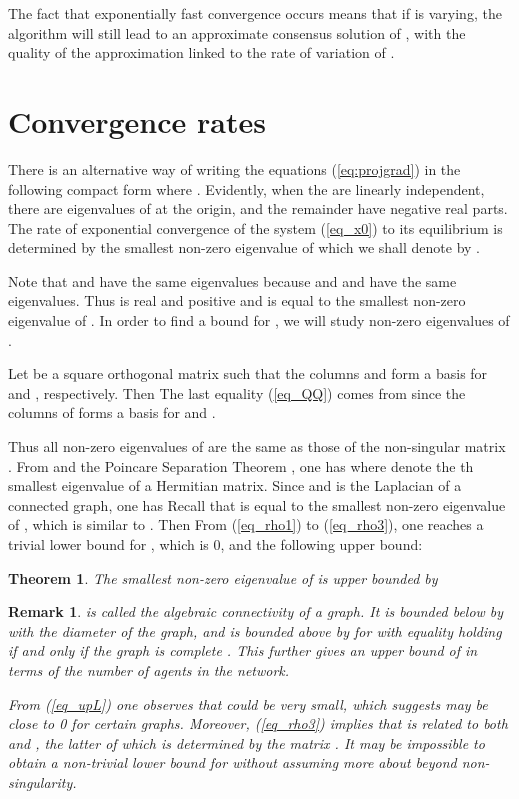\documentclass{aims}
\newtheorem{remark}{Remark}
\newtheorem{thm}{\textbf{Theorem}}
\def\eq#1{}
\begin{document}
The fact that exponentially fast convergence occurs means that if  is varying, the algorithm will still lead to an approximate consensus solution of , with the quality of the approximation linked to the rate of variation of .



\section{Convergence rates}
There is an alternative way of writing the equations (\ref{eq:projgrad}) in the following compact form
 where .
Evidently, when the  are linearly independent, there are  eigenvalues of  at the origin, and the remainder have negative real parts. The rate of exponential convergence of the system (\ref{eq_x0}) to its equilibrium is determined by the smallest non-zero eigenvalue of  which we shall denote by .

Note that  and  have the same eigenvalues because  and  and  have the same eigenvalues. Thus  is real and positive and is equal to the smallest non-zero eigenvalue of . In order to find a bound for , we will study non-zero eigenvalues of .



Let  be a square orthogonal matrix such that the columns  and  form a basis for  and , respectively.
Then  The last equality (\ref{eq_QQ}) comes from  since the columns of  forms a basis for  and .

Thus all non-zero eigenvalues of  are the same as those of the non-singular matrix . From  and the Poincare Separation Theorem \cite{RC85Book}, one has \eq{\label{eq_rho1}\lambda_1(\bar{L})\leq \lambda_1(\bar Q^{\top} \bar L \bar Q)\leq \lambda_{n+1}(\bar L)} where  denote the th smallest eigenvalue of a Hermitian matrix. Since  and  is the Laplacian of a connected graph, one has \eq{\label{eq_rho2}\lambda_1(\bar L)=0,\quad \lambda_{n+1}(\bar L)=\lambda_2(L)}
Recall that  is equal to the smallest non-zero eigenvalue of , which is similar to . Then \eq{\label{eq_rho3}\rho=\lambda_1(\bar{Q}^{\top}\bar{L}\bar{Q})} From (\ref{eq_rho1}) to (\ref{eq_rho3}), one reaches a trivial lower bound for , which is 0, and the following upper bound:
\begin{thm}
The smallest non-zero eigenvalue of  is upper bounded by \eq{ \rho \leq \lambda_2(L)}
\end{thm}
\begin{remark}
 is called the algebraic connectivity of a graph. It is bounded below by \cite{Mohar91} \eq{\label{eq_upL}\lambda_2(L)\geq \frac{4}{nD}} with  the diameter of the graph, and is bounded above by   for  with equality holding if and only if the graph is complete \cite{Fan97}. This further gives an upper bound of  in terms of the number of agents in the network.

From (\ref{eq_upL}) one observes that  could be very small, which suggests  may be close to 0 for certain graphs. Moreover, (\ref{eq_rho3}) implies that  is related to both  and , the latter of which is determined by the matrix . It may be impossible to obtain a non-trivial lower bound for  without assuming more about  beyond non-singularity.
\end{remark}
\end{document}
